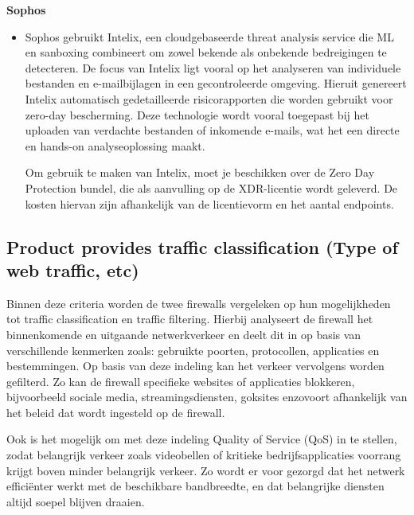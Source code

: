 \textbf{Sophos}
\begin{itemize}[label=\textbullet]
    \item Sophos gebruikt Intelix, een cloudgebaseerde threat analysis service die ML en sanboxing combineert om zowel bekende als onbekende bedreigingen te detecteren. De focus van Intelix ligt vooral op het analyseren van individuele bestanden en e-mailbijlagen in een gecontroleerde omgeving. Hieruit genereert Intelix automatisch gedetailleerde risicorapporten die worden gebruikt voor zero-day bescherming. Deze technologie wordt vooral toegepast bij het uploaden van verdachte bestanden of inkomende e-mails, wat het een directe en hands-on analyseoplossing maakt. \autocite{SophosIN2025}
    
    Om gebruik te maken van Intelix, moet je beschikken over de Zero Day Protection bundel, die als aanvulling op de XDR-licentie wordt geleverd. De kosten hiervan zijn afhankelijk van de licentievorm en het aantal endpoints.
\end{itemize}



\subsection{Product provides traffic classification (Type of web traffic, etc)}

Binnen deze criteria worden de twee firewalls vergeleken op hun mogelijkheden tot traffic classification en traffic filtering. Hierbij analyseert de firewall het binnenkomende en uitgaande netwerkverkeer en deelt dit in op basis van verschillende kenmerken zoals: gebruikte poorten, protocollen, applicaties en bestemmingen. Op basis van deze indeling kan het verkeer vervolgens worden gefilterd. Zo kan de firewall specifieke websites of applicaties blokkeren, bijvoorbeeld sociale media, streamingsdiensten, goksites enzovoort afhankelijk van het beleid dat wordt ingesteld op de firewall.

Ook is het mogelijk om met deze indeling Quality of Service (QoS) in te stellen, zodat belangrijk verkeer zoals videobellen of kritieke bedrijfsapplicaties voorrang krijgt boven minder belangrijk verkeer. Zo wordt er voor gezorgd dat het netwerk efficiënter werkt met de beschikbare bandbreedte, en dat belangrijke diensten altijd soepel blijven draaien.

